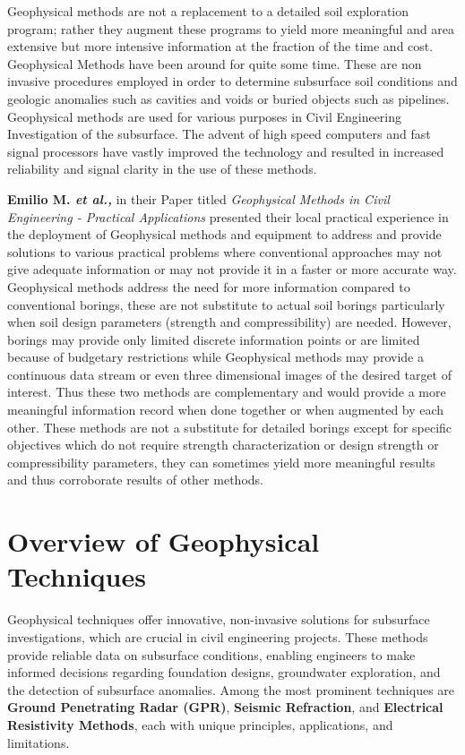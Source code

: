 \documentclass[12pt,a4paper]{report}
\begin{document}
Geophysical methods are not a replacement to a detailed soil exploration program; rather they augment these programs to yield more meaningful and area extensive but more intensive information at the fraction of the time and cost. Geophysical Methods have been around for quite some time. These are non invasive procedures employed in order to determine subsurface soil conditions and geologic anomalies such as cavities and voids or buried objects such as pipelines. Geophysical methods are used for various purposes in Civil Engineering Investigation of the subsurface. The advent of high speed computers and fast signal processors have vastly improved the technology and resulted in increased reliability and signal clarity in the use of these methods.

\textbf{Emilio M. \textit{et al.,}} in their Paper titled \textit{Geophysical Methods in Civil Engineering - Practical Applications} presented their local practical experience in the deployment of Geophysical methods and equipment to address and provide solutions to various practical problems where conventional approaches may not give adequate information or may not provide it in a faster or more accurate way. Geophysical methods address the need for more information compared to conventional borings, these are not substitute to actual soil borings particularly when soil design parameters (strength and compressibility) are needed. However, borings may provide only limited discrete information points or are limited because of budgetary restrictions while Geophysical methods may provide a continuous data stream or even three dimensional images of the desired target of interest. Thus these two methods are complementary and would provide a more meaningful information record when done together or when augmented by each other. These methods are not a substitute for detailed borings except for specific objectives which do not require strength characterization or design strength or compressibility parameters, they can sometimes yield more meaningful results and thus corroborate results of other methods.

\section{Overview of Geophysical Techniques}
Geophysical techniques offer innovative, non-invasive solutions for subsurface investigations, which are crucial in civil engineering projects. These methods provide reliable data on subsurface conditions, enabling engineers to make informed decisions regarding foundation designs, groundwater exploration, and the detection of subsurface anomalies. Among the most prominent techniques are \textbf{Ground Penetrating Radar (GPR)}, \textbf{Seismic Refraction}, and \textbf{Electrical Resistivity Methods}, each with unique principles, applications, and limitations.
\end{document}

